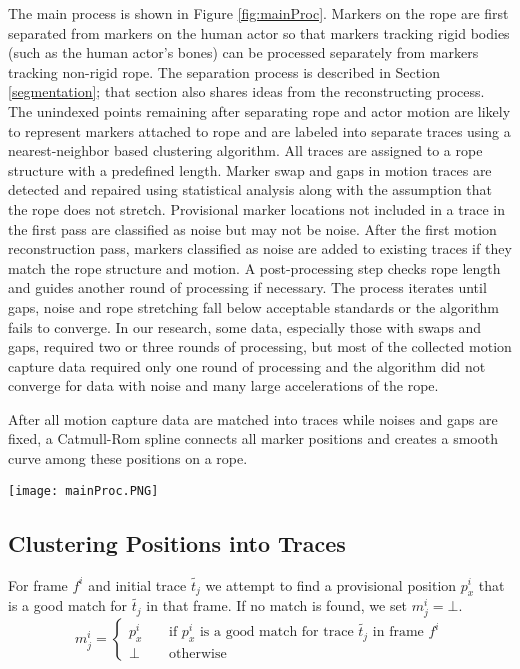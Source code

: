 The main process is shown in Figure \ref{fig:mainProc}.  Markers on the rope are first separated from markers on the human actor so that markers tracking rigid bodies (such as the human actor's bones) can be processed separately from markers tracking non-rigid rope. The separation process is described in Section \ref{segmentation}; that section also shares ideas  from the reconstructing process. The unindexed points remaining after separating rope and actor motion are likely to represent markers attached to rope and are labeled into separate traces using a nearest-neighbor based clustering algorithm. All traces are assigned to a rope structure with a predefined length. Marker swap and gaps in motion traces are detected and repaired using statistical analysis along with the assumption that the rope does not stretch. Provisional marker locations not included in a trace in the first pass are classified as noise but may not be noise. After the first motion reconstruction pass, markers classified as noise are added to existing traces if they match the rope structure and motion. A post-processing step checks rope length and guides another round of processing if necessary. The process iterates until gaps, noise and rope stretching fall below acceptable standards or the algorithm fails to converge. In our research, some data, especially those with swaps and gaps, required two or three rounds of processing, but most of the collected motion capture data required only one round of processing and the algorithm did not converge for data with noise and many large accelerations of the rope.

After all motion capture data are matched into traces while noises and gaps are fixed, a Catmull-Rom spline connects all marker positions and creates a smooth curve among these positions on a rope.

\begin{figure*}[tb]
\begin{center}
\texttt{[image: mainProc.PNG]}
\end{center}
\caption{Process for converting unindexed marker positions into motion paths.}
\label{fig:mainProc} 
\end{figure*}

\subsection{Clustering Positions into Traces}
\label{secClustering}

For frame $f^i$ and initial trace $\tilde{t_j}$ we attempt to find a provisional position $p_x^i$ that is a good match for $\tilde{t_j}$ in that frame.  If no match is found, we set $m_j^i=\bot$.
\[
m_j^i=\left\{\begin{array}{ll}p_x^i & \ \ \ \ \ \mbox{if $p_x^i$ is a good match for trace $\tilde{t_j}$ in frame $f^i$}\\
\bot & \ \ \ \ \ \mbox{otherwise}\end{array}\right.
\]

